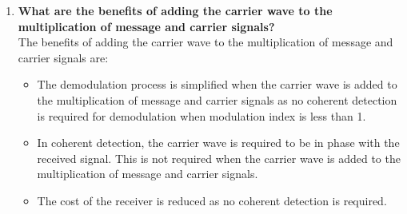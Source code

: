 \begin{enumerate}
        \item \textbf{What are the benefits of adding the carrier wave to the multiplication of message and
        carrier signals?}\\
        The benefits of adding the carrier wave to the multiplication of message and carrier signals are:
        \begin{itemize}
            \item The demodulation process is simplified when the carrier wave is added to the multiplication of message and carrier signals as no coherent detection is required for demodulation when modulation index is less than 1.
            \item In coherent detection, the carrier wave is required to be in phase with the received signal. This is not required when the carrier wave is added to the multiplication of message and carrier signals.
            \item The cost of the receiver is reduced as no coherent detection is required.
        \end{itemize}
\end{enumerate}